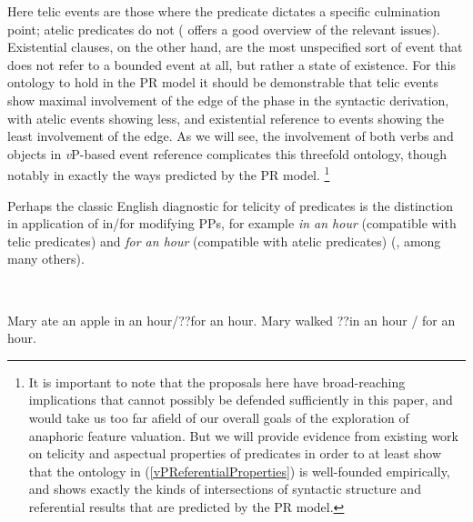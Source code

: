 \documentclass[output=paper
,modfonts
,nonflat
]{langsci/langscibook}
\begin{document}
\z
\noindent Here telic events are those where the predicate dictates a specific culmination point; atelic predicates do not (\citealt{Beavers:2012} offers a good overview of the relevant issues). Existential clauses, on the other hand, are the most unspecified sort of event that does not refer to a bounded event at all, but rather a state of existence. For this ontology to hold in the PR model it should be demonstrable that telic events show maximal involvement of the edge of the phase in the syntactic derivation, with atelic events showing less, and existential reference to events showing the least involvement of the edge. As we will see, the involvement of both verbs and objects in \textit{v}P-based event reference complicates this threefold ontology, though notably in exactly the ways predicted by the PR model. \footnote{It is important to note that the proposals here have broad-reaching implications that cannot possibly be defended sufficiently in this paper, and would take us too far afield of our overall goals of the exploration of anaphoric feature valuation. But we will provide evidence from existing work on telicity and aspectual properties of predicates in order to at least show that the ontology in (\ref{vPReferentialProperties}) is well-founded empirically, and shows exactly the kinds of intersections of syntactic structure and referential results that are predicted by the PR model.} 

Perhaps the classic English diagnostic for telicity of predicates is the distinction in application of in/for modifying PPs, for example \textit{in an hour} (compatible with telic predicates) and \textit{for an hour} (compatible with atelic predicates) (\citealt{Vendler:1967,Dowty:1979,Thompson:2006,Beavers:2012}, among many others). 

\ea
{} \\
\begin{xlist}
\ex Mary ate an apple in an hour/??for an hour.   
\ex Mary walked ??in an hour / for an hour.
\end{xlist}
\end{document}
